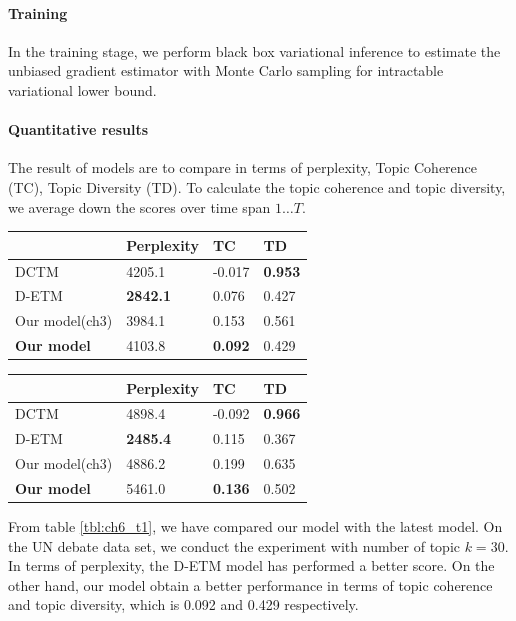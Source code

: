 \paragraph{Training}
In the training stage, we perform black box variational inference to estimate the unbiased gradient estimator with Monte Carlo sampling for intractable variational lower bound.
\paragraph{Quantitative results}
The result of models are to compare in terms of perplexity, Topic Coherence (TC), Topic Diversity (TD). To calculate the topic coherence and topic diversity, we average down the scores over time span $ 1\dots T $.
\begin{table}[h]
\centering
\begin{tabular}{llll}
\hline
     & Perplexity  &TC&TD\\ \hline
DCTM	     	&  4205.1 & -0.017 & \textbf{0.953}\\
D-ETM	     	&  \textbf{2842.1} & 0.076 & 0.427 \\
Our model(ch3) & 3984.1 & 0.153 & 0.561\\
\textbf{Our model}  & 4103.8 & \textbf{0.092} & 0.429\\ \hline
\end{tabular}
\end{table}
\begin{table}[h]
\centering
\begin{tabular}{llll}
\hline
     & Perplexity & TC & TD \\\hline
DCTM	     	& 4898.4 & -0.092 & \textbf{0.966} \\
D-ETM	     	& \textbf{2485.4} & 0.115 & 0.367 \\
Our model(ch3) & 4886.2 & 0.199 &0.635 \\
\textbf{Our model}  & 5461.0 & \textbf{0.136} & 0.502 \\ \hline
\end{tabular}
\end{table}
From table \ref{tbl:ch6_t1}, we have compared our model with the latest model. On the UN debate data set, we conduct the experiment with number of topic $ k=30 $. In terms of perplexity, the D-ETM model has performed a better score. On the other hand, our model obtain a better performance in terms of topic coherence and topic diversity, which is 0.092 and 0.429 respectively. 
